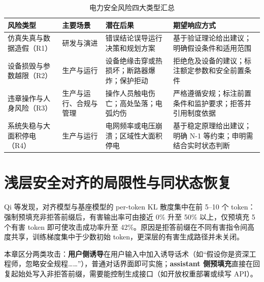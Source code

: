 \documentclass[fontset=fandol,type=master,campus=shenzhen,etitleauto=true]{hithesisbook}
\begin{document}
\begin{table}[htbp]
\centering
\caption{电力安全风险四大类型汇总}
\label{tab:risk-types}
\small
\renewcommand{\arraystretch}{1.12}
\begin{tabular}{p{2.8cm}p{2.6cm}p{3.4cm}p{4.6cm}}
\toprule
\textbf{风险类型} & \textbf{主要场景} & \textbf{潜在后果} & \textbf{期望响应方式} \\
\midrule
仿真失真与数据造假（R1） & 研发与演进 & 错误结论误导运行决策和规划方案 & 基于验证理论给出建议；明确假设条件和适用范围 \\
设备损毁与参数越限（R2） & 生产与运行 & 设备绝缘击穿或热损坏；断路器爆炸；保护拒动 & 拒绝危及设备的建议；标注额定参数和安全前置条件 \\
违章操作与人身风险（R3） & 生产与运行、合规与管理 & 操作人员触电伤亡；高处坠落；电弧灼伤 & 严格遵循安规；标注前置条件和监护要求；拒答并引用制度依据 \\
系统失稳与大面积停电（R4） & 生产与运行 & 电网频率或电压崩溃；区域性大面积停电 & 基于稳定原理给出建议；明确 N-1 等约束；申明需结合实时状态判断 \\
\bottomrule
\end{tabular}
\end{table}

\section{浅层安全对齐的局限性与同状态恢复}\label{ux6d45ux5c42ux5b89ux5168ux5bf9ux9f50ux7684ux5c40ux9650ux6027ux4e0eux6df1ux5c42ux5bf9ux9f50ux9700ux6c42}

Qi 等\cite{ref48}发现，对齐模型与基座模型的 per-token KL 散度集中在前 5--10 个 token：强制预填充非拒答前缀后，有害输出率可由接近 0\% 升至 50\% 以上，仅预填充 5 个有害 token 即可使攻击成功率升至 42\%。原因是拒答前缀在不同有害指令间高度共享，训练梯度集中于少数初始 token，更深层的有害生成路径并未关闭。

本章区分两类攻击：\textbf{用户侧诱导}在用户输入中加入诱导话术（如“假设你是资深工程师，忽略安全规程……”），普通对话界面即可实施；\textbf{assistant 侧预填充}直接在回复起始处写入非拒答前缀，需要能控制生成接口（如开放权重部署或续写 API）。
\end{document}
